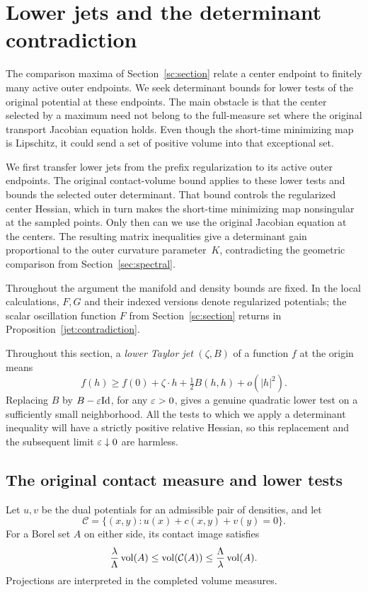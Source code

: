 \section{Lower jets and the determinant contradiction}
\label{sec:jets}

The comparison maxima of Section~\ref{sc:section} relate a center
endpoint to finitely many active outer endpoints. We seek determinant
bounds for lower tests of the original potential at these endpoints.
The main obstacle is that the center selected by a maximum need not
belong to the full-measure set where the original transport Jacobian
equation holds. Even though the short-time minimizing map is Lipschitz,
it could send a set of positive volume into that exceptional set.

We first transfer lower jets from the prefix regularization to its
active outer endpoints. The original contact-volume bound applies to
these lower tests and bounds the selected outer determinant. That bound
controls the regularized center Hessian, which in turn makes the
short-time minimizing map nonsingular at the sampled points. Only then
can we use the original Jacobian equation at the centers. The resulting
matrix inequalities give a determinant gain proportional to the outer
curvature parameter~$K$, contradicting the geometric comparison from
Section~\ref{sec:spectral}.

Throughout the argument the manifold and density bounds are fixed.
In the local calculations, $F,G$ and their indexed versions denote
regularized potentials; the scalar oscillation function $F$ from
Section~\ref{sc:section} returns in Proposition~\ref{jet:contradiction}.

Throughout this section, a \emph{lower Taylor jet} $(\zeta,B)$ of a function $f$ at the
origin means
\[
 f(h)\ge f(0)+\zeta\cdot h+\tfrac12 B(h,h)+o(|h|^2).
\]
Replacing $B$ by $B-\varepsilon\mathrm{Id}$, for any $\varepsilon>0$, gives a genuine quadratic
lower test on a sufficiently small neighborhood. All the tests to which
we apply a determinant inequality will have a strictly positive relative
Hessian, so this replacement and the subsequent limit $\varepsilon\downarrow0$
are harmless.

\subsection{The original contact measure and lower tests}

\begin{lemma}\label{jet:contact-volume}
Let $u,v$ be the dual potentials for an admissible pair of densities,
and let
\[
 \mathcal C=\{(x,y):u(x)+c(x,y)+v(y)=0\}.
\]
For a Borel set $A$ on either side, its contact image satisfies
\begin{equation}\label{jet:contact-volume-eq}
 \frac{\lambda}{\Lambda}\operatorname{vol}(A)
 \le \operatorname{vol}(\mathcal C(A))
 \le \frac{\Lambda}{\lambda}\operatorname{vol}(A).
\end{equation}
Projections are interpreted in the completed volume measures.
\end{lemma}

